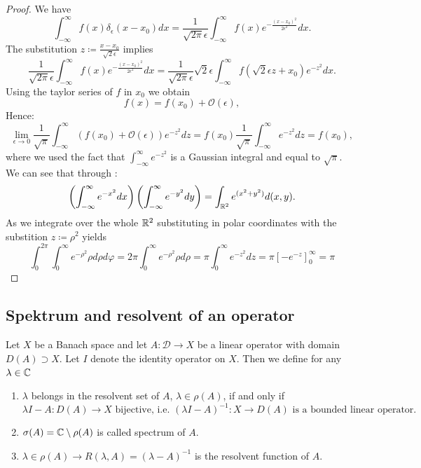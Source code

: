 \begin{proof}
	We have
	\[ \int_{-\infty}^{\infty} f(x) \delta_{\epsilon}(x-x_{0}) dx = \frac{1}{\sqrt{2\pi} \epsilon} \int_{-\infty}^{\infty} f(x) e^{-\frac{(x - x_{0})^{2}}{2 \epsilon^{2}}} dx. \] 
	The substitution $z \coloneqq \frac{x - x_{0}}{\sqrt{2} \epsilon}$ implies 
	\[ \frac{1}{\sqrt{2\pi} \epsilon} \int_{-\infty}^{\infty} f(x) e^{-\frac{(x - x_{0})^{2}}{2 \epsilon^{2}}} dx = \frac{1}{\sqrt{2\pi} \epsilon} \sqrt{2} \epsilon \int_{-\infty}^{\infty} f(\sqrt{2} \epsilon z + x_{0}) e^{-z^{2}} dx. \]
	Using the taylor series of $f$ in $x_{0}$ we obtain
	\[ f(x) = f(x_{0}) + \mathcal{O}(\epsilon), \]
	Hence:
	\[ \lim_{\epsilon \rightarrow 0} \frac{1}{\sqrt{\pi}} \int_{-\infty}^{\infty} (f(x_{0}) + \mathcal{O}(\epsilon)) e^{-z^{2}} dz = f(x_{0}) \frac{1}{\sqrt{\pi}} \int_{-\infty}^{\infty} e^{-z^{2}} dz = f(x_{0}), \]
	where we used the fact that $\int_{-\infty}^{\infty} e^{-z^{2}}$ is a Gaussian integral and equal to $\sqrt{\pi}$. We can see that through :
	\[ \left( \int_{-\infty}^{\infty} e^{-x^{2}} dx \right) \left( \int_{-\infty}^{\infty} e^{-y^{2}} dy \right) = \int_{\mathbb{R}^{2}} e^{(x^{2} + y^{2})} d(x, y). \] 
	As we integrate over the whole $\mathbb{R}^{2}$ substituting in polar coordinates with the substition $z \coloneqq \rho^{2}$ yields
	\[ \int_{0}^{2 \pi} \int_{0}^{\infty} e^{-\rho^{2}} \rho d\rho d\varphi = 2 \pi \int_{0}^{\infty} e^{-\rho^{2}} \rho d\rho = \pi \int_{0}^{\infty} e^{-z^{2}} dz = \pi \left[ -e^{-z} \right]_{0}^{\infty} = \pi \]
\end{proof} 


\subsection*{Spektrum and resolvent of an operator}

Let $X$ be a Banach space and let $A \colon \mathcal{D} \rightarrow X$ be a  linear operator with domain $D(A) \supset X$. Let $I$ denote the identity operator on $X$. Then we define for any $\lambda \in \mathbb{C}$
	\begin{enumerate}[label=\alph*\upshape)]
		\item $\lambda$ belongs in the resolvent set of $A$, $\lambda \in \rho(A)$, if and only if
			\[ \lambda I - A \colon D(A) \rightarrow X \text{ bijective, i.e. } (\lambda I - A)^{-1} \colon X \rightarrow D(A) \text{ is a bounded linear operator.} \]
		\item $\sigma(A) = \mathbb{C} \setminus \rho(A)$ is called spectrum of $A$.
		\item $\lambda \in \rho(A) \rightarrow R(\lambda, A) = (\lambda - A)^{-1}$ is the resolvent function of $A$.
	\end{enumerate}	
	

